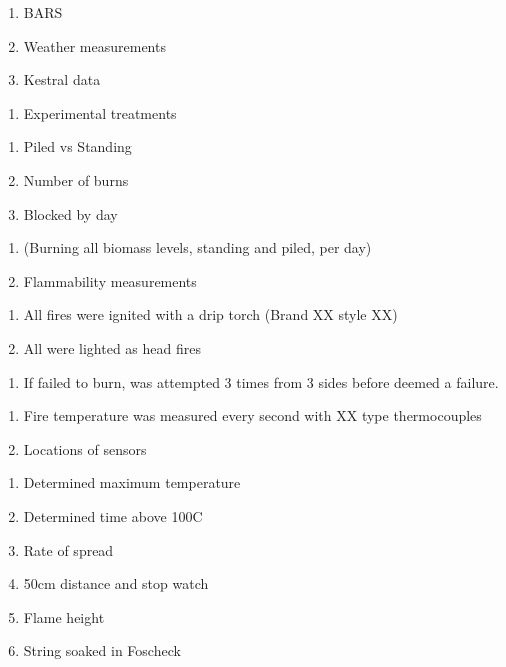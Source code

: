 \documentclass[11pt,a4paper]{article}
\begin{document}
\begin{enumerate}
\def\labelenumi{\alph{enumi}.}
\tightlist
\item
  BARS
\item
  Weather measurements
\item
  Kestral data
\end{enumerate}

\begin{enumerate}
\def\labelenumi{\arabic{enumi}.}
\setcounter{enumi}{2}
\tightlist
\item
  Experimental treatments
\end{enumerate}

\begin{enumerate}
\def\labelenumi{\alph{enumi}.}
\tightlist
\item
  Piled vs Standing
\item
  Number of burns
\item
  Blocked by day
\end{enumerate}

\begin{enumerate}
\def\labelenumi{\arabic{enumi}.}
\item
  (Burning all biomass levels, standing and piled, per day)
\item
  Flammability measurements
\end{enumerate}

\begin{enumerate}
\def\labelenumi{\alph{enumi}.}
\tightlist
\item
  All fires were ignited with a drip torch (Brand XX style XX)
\item
  All were lighted as head fires
\end{enumerate}

\begin{enumerate}
\def\labelenumi{\roman{enumi}.}
\setcounter{enumi}{1}
\tightlist
\item
  If failed to burn, was attempted 3 times from 3 sides before deemed a
  failure.
\end{enumerate}

\begin{enumerate}
\def\labelenumi{\alph{enumi}.}
\setcounter{enumi}{1}
\tightlist
\item
  Fire temperature was measured every second with XX type thermocouples
\item
  Locations of sensors
\end{enumerate}

\begin{enumerate}
\def\labelenumi{\roman{enumi}.}
\setcounter{enumi}{1}
\tightlist
\item
  Determined maximum temperature
\item
  Determined time above 100C
\item
  Rate of spread
\item
  50cm distance and stop watch
\item
  Flame height
\item
  String soaked in Foscheck
\end{enumerate}
\end{document}
